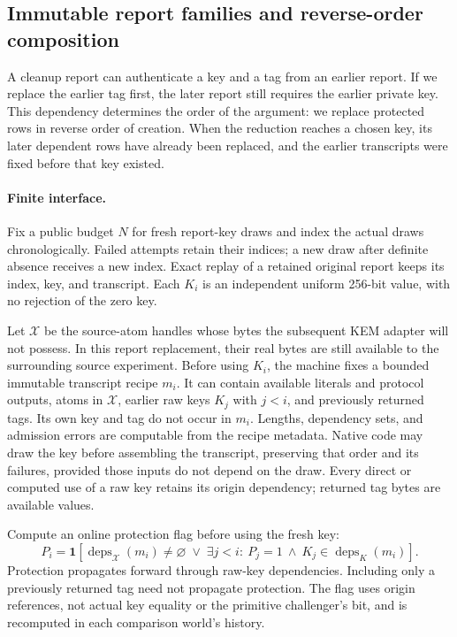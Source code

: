 \documentclass[pdflatex]{sn-jnl}
\theoremstyle{thmstyleone}
\theoremstyle{thmstylethree}
\theoremstyle{thmstyletwo}
\begin{document}
\subsection{Immutable report families and reverse-order composition}
\label{sec:report-composition}

A cleanup report can authenticate a key and a tag from an earlier
report. If we replace the earlier tag first, the later report still
requires the earlier private key. This dependency determines the order
of the argument: we replace protected rows in reverse order of creation.
When the reduction reaches a chosen key, its later dependent rows have
already been replaced, and the earlier transcripts were fixed before
that key existed.

\paragraph{Finite interface.}
Fix a public budget $N$ for fresh report-key draws and index the actual draws
chronologically.  Failed attempts retain their indices; a new draw after
definite absence receives a new index.  Exact replay of a retained original
report keeps its index, key, and transcript.  Each $K_i$ is an independent
uniform 256-bit value, with no rejection of the zero key.

Let $\mathcal X$ be the source-atom handles whose bytes the subsequent KEM
adapter will not possess.  In this report replacement, their real bytes are
still available to the surrounding source experiment.  Before using $K_i$, the
machine fixes a bounded immutable transcript recipe $m_i$.  It can contain
available literals and protocol outputs, atoms in $\mathcal X$, earlier raw
keys $K_j$ with $j<i$, and previously returned tags.  Its own key and tag do not
occur in $m_i$.  Lengths, dependency sets, and admission errors are computable
from the recipe metadata.  Native code may draw the key before assembling the
transcript, preserving that order and its failures, provided those inputs do
not depend on the draw.  Every direct or computed use of a raw key retains its
origin dependency; returned tag bytes are available values.

Compute an online protection flag before using the fresh key:
\begin{equation}
 P_i=\mathbf 1\!\left[
 \operatorname{deps}_{\mathcal X}(m_i)\ne\varnothing
 \;\lor\;
 \exists j<i:\ P_j=1\ \land\ K_j\in\operatorname{deps}_{K}(m_i)
 \right].
 \label{eq:report-protection}
\end{equation}
Protection propagates forward through raw-key dependencies. Including only
a previously returned tag need not propagate protection. The flag uses origin references, not
actual key equality or the primitive challenger's bit, and is recomputed in
each comparison world's history.
\end{document}
